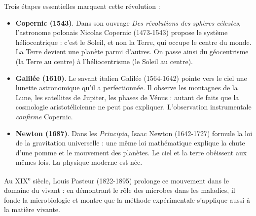 \documentclass[11pt]{article}
\newcommand{\cle}[1]{{\popxbold\color{popdark}#1}}
\begin{document}
Trois étapes essentielles marquent cette révolution :

\begin{itemize}
\item \textbf{Copernic (1543)}. Dans son ouvrage \emph{Des révolutions des sphères célestes}, l'astronome polonais Nicolas Copernic (1473-1543) propose le système \cle{héliocentrique} : c'est le Soleil, et non la Terre, qui occupe le centre du monde. La Terre devient une planète parmi d'autres. On passe ainsi du \cle{géocentrisme} (la Terre au centre) à l'\cle{héliocentrisme} (le Soleil au centre).
\item \textbf{Galilée (1610)}. Le savant italien Galilée (1564-1642) pointe vers le ciel une lunette astronomique qu'il a perfectionnée. Il observe les montagnes de la Lune, les satellites de Jupiter, les phases de Vénus : autant de faits que la cosmologie aristotélicienne ne peut pas expliquer. L'observation instrumentale \emph{confirme} Copernic.
\item \textbf{Newton (1687)}. Dans les \emph{Principia}, Isaac Newton (1642-1727) formule la loi de la gravitation universelle : une même loi mathématique explique la chute d'une pomme et le mouvement des planètes. Le ciel et la terre obéissent aux mêmes lois. La physique moderne est née.
\end{itemize}

Au XIX\textsuperscript{e} siècle, Louis Pasteur (1822-1895) prolonge ce mouvement dans le domaine du vivant : en démontrant le rôle des microbes dans les maladies, il fonde la microbiologie et montre que la méthode expérimentale s'applique aussi à la matière vivante.
\end{document}
